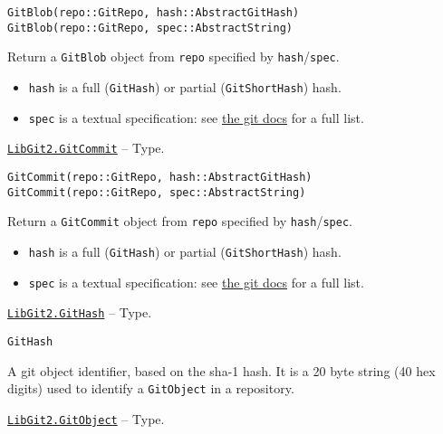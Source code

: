 \begin{adjustwidth}{2em}{0pt}


\begin{verbatim}
GitBlob(repo::GitRepo, hash::AbstractGitHash)
GitBlob(repo::GitRepo, spec::AbstractString)
\end{verbatim}

Return a \texttt{GitBlob} object from \texttt{repo} specified by \texttt{hash}/\texttt{spec}.

\begin{itemize}
\item \texttt{hash} is a full (\texttt{GitHash}) or partial (\texttt{GitShortHash}) hash.


\item \texttt{spec} is a textual specification: see \href{https://git-scm.com/docs/git-rev-parse.html\#\_specifying\_revisions}{the git docs} for a full list.

\end{itemize}


\end{adjustwidth}
\hypertarget{5346527129202716606}{} 
\hyperlink{5346527129202716606}{\texttt{LibGit2.GitCommit}}  -- {Type.}

\begin{adjustwidth}{2em}{0pt}


\begin{verbatim}
GitCommit(repo::GitRepo, hash::AbstractGitHash)
GitCommit(repo::GitRepo, spec::AbstractString)
\end{verbatim}

Return a \texttt{GitCommit} object from \texttt{repo} specified by \texttt{hash}/\texttt{spec}.

\begin{itemize}
\item \texttt{hash} is a full (\texttt{GitHash}) or partial (\texttt{GitShortHash}) hash.


\item \texttt{spec} is a textual specification: see \href{https://git-scm.com/docs/git-rev-parse.html\#\_specifying\_revisions}{the git docs} for a full list.

\end{itemize}


\end{adjustwidth}
\hypertarget{202290709580230708}{} 
\hyperlink{202290709580230708}{\texttt{LibGit2.GitHash}}  -- {Type.}

\begin{adjustwidth}{2em}{0pt}


\begin{verbatim}
GitHash
\end{verbatim}

A git object identifier, based on the sha-1 hash. It is a 20 byte string (40 hex digits) used to identify a \texttt{GitObject} in a repository.



\end{adjustwidth}
\hypertarget{4668198389828625678}{} 
\hyperlink{4668198389828625678}{\texttt{LibGit2.GitObject}}  -- {Type.}

